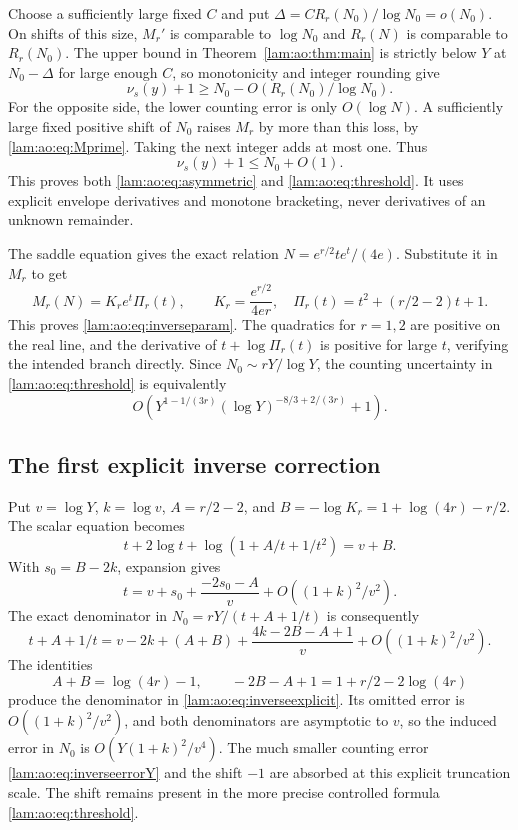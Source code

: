 \documentclass[11pt,a4paper]{article}
\numberwithin{equation}{section}
\theoremstyle{remark}
\begin{document}
Choose a sufficiently large fixed $C$ and put $\Delta=C R_r(N_0)/\log N_0=o(N_0)$. On shifts of this size, $M_r'$ is comparable to $\log N_0$ and $R_r(N)$ is comparable to $R_r(N_0)$. The upper bound in Theorem~\ref{lam:ao:thm:main} is strictly below $Y$ at $N_0-\Delta$ for large enough $C$, so monotonicity and integer rounding give
\[
 \nu_s(y)+1\ge N_0-O(R_r(N_0)/\log N_0).
\]
For the opposite side, the lower counting error is only $O(\log N)$. A sufficiently large fixed positive shift of $N_0$ raises $M_r$ by more than this loss, by \eqref{lam:ao:eq:Mprime}. Taking the next integer adds at most one. Thus
\[
 \nu_s(y)+1\le N_0+O(1).
\]
This proves both \eqref{lam:ao:eq:asymmetric} and \eqref{lam:ao:eq:threshold}. It uses explicit envelope derivatives and monotone bracketing, never derivatives of an unknown remainder.

The saddle equation gives the exact relation $N=e^{r/2}te^t/(4e)$. Substitute it in $M_r$ to get
\[
 M_r(N)=K_re^t\Pi_r(t),\qquad
 K_r=\frac{e^{r/2}}{4er},\quad \Pi_r(t)=t^2+(r/2-2)t+1.
\]
This proves \eqref{lam:ao:eq:inverseparam}. The quadratics for $r=1,2$ are positive on the real line, and the derivative of $t+\log\Pi_r(t)$ is positive for large $t$, verifying the intended branch directly. Since $N_0\sim rY/\log Y$, the counting uncertainty in \eqref{lam:ao:eq:threshold} is equivalently
\begin{equation}\label{lam:ao:eq:inverseerrorY}
 O\!\left(Y^{1-1/(3r)}(\log Y)^{-8/3+2/(3r)}+1\right).
\end{equation}

\subsection{The first explicit inverse correction}
Put $v=\log Y$, $k=\log v$, $A=r/2-2$, and $B=-\log K_r=1+\log(4r)-r/2$. The scalar equation becomes
\begin{equation}\label{lam:ao:eq:invimplicit}
 t+2\log t+\log(1+A/t+1/t^2)=v+B.
\end{equation}
With $s_0=B-2k$, expansion gives
\[
 t=v+s_0+\frac{-2s_0-A}{v}+O((1+k)^2/v^2).
\]
The exact denominator in $N_0=rY/(t+A+1/t)$ is consequently
\[
 t+A+1/t=v-2k+(A+B)+\frac{4k-2B-A+1}{v}
          +O((1+k)^2/v^2).
\]
The identities
\[
 A+B=\log(4r)-1,\qquad -2B-A+1=1+r/2-2\log(4r)
\]
produce the denominator in \eqref{lam:ao:eq:inverseexplicit}. Its omitted error is $O((1+k)^2/v^2)$, and both denominators are asymptotic to $v$, so the induced error in $N_0$ is $O(Y(1+k)^2/v^4)$. The much smaller counting error \eqref{lam:ao:eq:inverseerrorY} and the shift $-1$ are absorbed at this explicit truncation scale. The shift remains present in the more precise controlled formula \eqref{lam:ao:eq:threshold}.
\end{document}
